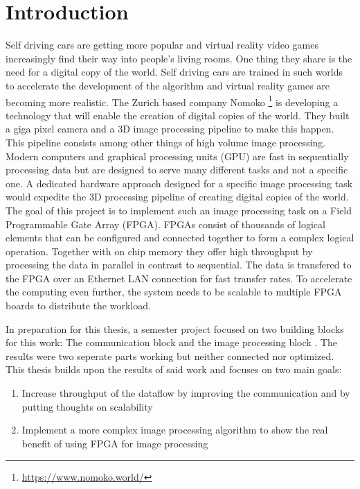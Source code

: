 
%
%
\chapter{Introduction}
Self driving cars are getting more popular and virtual reality video games
increasingly find their way into people's living rooms. One thing they share is
the need for a digital copy of the world. Self driving cars are trained in such
worlds to
accelerate the development of the algorithm and virtual reality games are
becoming more realistic. The Zurich based company Nomoko \footnote{
\url{https://www.nomoko.world/}} is developing a
technology that will enable the creation of digital copies of the world. They
built a giga pixel camera and a 3D image processing pipeline to make this happen. This pipeline
consists among other things of high volume image processing. Modern computers
and graphical processing units (GPU) are fast in sequentially processing data
but are designed to serve many different tasks and not a specific one. A
dedicated hardware approach designed for a specific image processing task would
expedite the 3D processing pipeline of creating digital copies of the world.
\\

The goal of this project is to implement such an image processing task on a
Field
Programmable Gate Array (FPGA). FPGAs
consist of thousands of logical elements that can be configured and connected
together to form a complex logical operation. Together with on chip
memory they offer high throughput by processing the data in parallel in contrast to
sequential. The data is transfered to the FPGA over an Ethernet LAN connection
for
fast transfer rates. To accelerate the computing even further, the system needs
to be scalable to multiple FPGA boards to distribute the workload.

In preparation for this thesis, a semester project focused on two building
blocks for this work: The communication block and the image processing block
\cite{p5report}. The results were two seperate parts working but neither
connected nor optimized. This thesis builds upon the results of said work and
focuses on two main goals:
\\

\begin{enumerate}
    \item Increase throughput of the dataflow by improving the communication and
    by putting thoughts on scalability
    \item Implement a more complex image processing algorithm to show the real
    benefit of using FPGA for image processing
\end{enumerate}
%     

